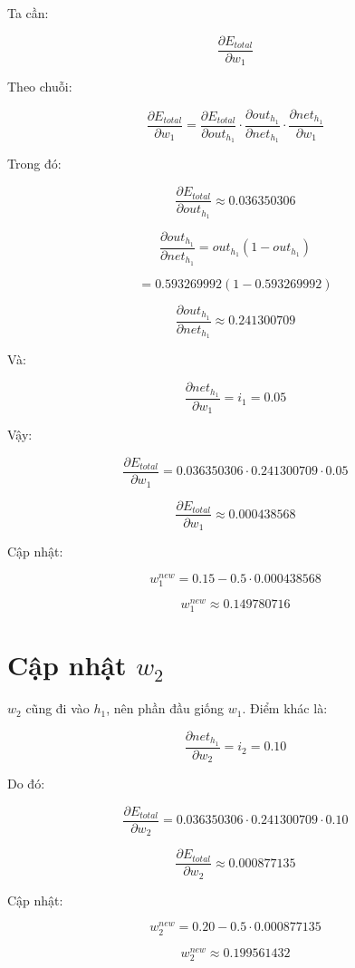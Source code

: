 \documentclass[12pt,a4paper]{report}
\begin{document}
Ta cần:

\[
    \frac{\partial E_{total}}{\partial w_1}
\]

Theo chuỗi:

\[
    \frac{\partial E_{total}}{\partial w_1}
    =
    \frac{\partial E_{total}}{\partial out_{h_1}}
    \cdot
    \frac{\partial out_{h_1}}{\partial net_{h_1}}
    \cdot
    \frac{\partial net_{h_1}}{\partial w_1}
\]

Trong đó:

\[
    \frac{\partial E_{total}}{\partial out_{h_1}}
    \approx 0.036350306
\]

\[
    \frac{\partial out_{h_1}}{\partial net_{h_1}}
    =
    out_{h_1}(1-out_{h_1})
\]

\[
    =
    0.593269992(1-0.593269992)
\]

\[
    \frac{\partial out_{h_1}}{\partial net_{h_1}}
    \approx 0.241300709
\]

Và:

\[
    \frac{\partial net_{h_1}}{\partial w_1}=i_1=0.05
\]

Vậy:

\[
    \frac{\partial E_{total}}{\partial w_1}
    =
    0.036350306
    \cdot
    0.241300709
    \cdot
    0.05
\]

\[
    \frac{\partial E_{total}}{\partial w_1}
    \approx 0.000438568
\]

Cập nhật:

\[
    w_1^{new}
    =
    0.15
    -
    0.5\cdot 0.000438568
\]

\[
    w_1^{new}
    \approx 0.149780716
\]

\section{Cập nhật $w_2$}

$w_2$ cũng đi vào $h_1$, nên phần đầu giống $w_1$. Điểm khác là:

\[
    \frac{\partial net_{h_1}}{\partial w_2}=i_2=0.10
\]

Do đó:

\[
    \frac{\partial E_{total}}{\partial w_2}
    =
    0.036350306
    \cdot
    0.241300709
    \cdot
    0.10
\]

\[
    \frac{\partial E_{total}}{\partial w_2}
    \approx 0.000877135
\]

Cập nhật:

\[
    w_2^{new}
    =
    0.20
    -
    0.5\cdot 0.000877135
\]

\[
    w_2^{new}
    \approx 0.199561432
\]
\end{document}
